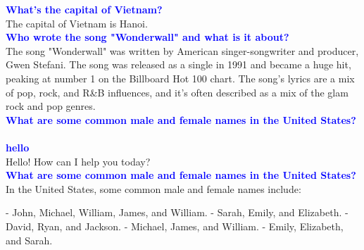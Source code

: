 \textcolor{blue}{\textbf{What's the capital of Vietnam?}}\\
The capital of Vietnam is Hanoi.\\\textcolor{blue}{\textbf{Who wrote the song "Wonderwall" and what is it about?}}\\
The song "Wonderwall" was written by American singer-songwriter and producer, Gwen Stefani. The song was released as a single in 1991 and became a huge hit, peaking at number 1 on the Billboard Hot 100 chart. The song's lyrics are a mix of pop, rock, and R&B influences, and it's often described as a mix of the glam rock and pop genres.\\\textcolor{blue}{\textbf{What are some common male and female names in the United States?}}\\\\\textcolor{blue}{\textbf{hello}}\\
Hello! How can I help you today?\\\textcolor{blue}{\textbf{What are some common male and female names in the United States?}}\\
In the United States, some common male and female names include:

- John, Michael, William, James, and William.
- Sarah, Emily, and Elizabeth.
- David, Ryan, and Jackson.
- Michael, James, and William.
- Emily, Elizabeth, and Sarah.

